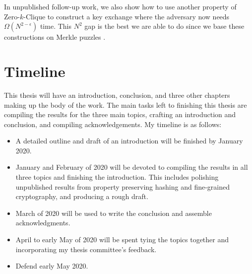 In unpublished follow-up work, we also show how to use another property of Zero-$k$-Clique to construct a key exchange where the adversary now needs $\Omega(N^{2 - \epsilon})$ time. This $N^2$ gap is the best we are able to do since we base these constructions on Merkle puzzles \cite{optimalMerklePuzzles}.

\section{Timeline}
This thesis will have an introduction, conclusion, and three other chapters making up the body of the work. The main tasks left to finishing this thesis are compiling the results for the three main topics, crafting an introduction and conclusion, and compiling acknowledgements. My timeline is as follows:
\begin{itemize}
	\item A detailed outline and draft of an introduction will be finished by January 2020.
	\item January and February of 2020 will be devoted to compiling the results in all three topics and finishing the introduction. This includes polishing unpublished results from property preserving hashing and fine-grained cryptography, and producing a rough draft.
	\item March of 2020 will be used to write the conclusion and assemble acknowledgments.
	\item April to early May of 2020 will be spent tying the topics together and incorporating my thesis committee's feedback.
	\item Defend early May 2020.
\end{itemize}